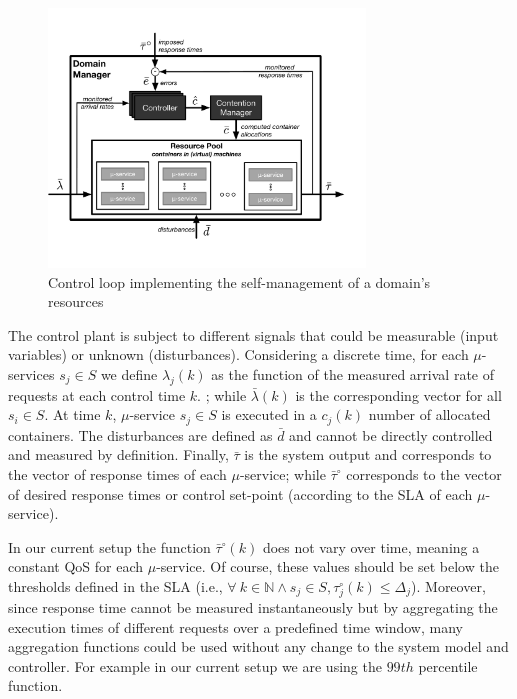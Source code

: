 \begin{figure}[tbp]
	\includegraphics[width=0.75\textwidth]{figs/domain-manager-allocation}
	\caption{Control loop implementing the self-management of a domain's resources}
	\label{fig:A3Edomain-manager}
\end{figure}



The control plant is subject to different signals that could be measurable (input variables) or unknown (disturbances). Considering a discrete time, for each $\mu$-services $s_j \in S$ we define $\lambda_j(k)$ as the function of the measured arrival rate of requests at each control time $k$.
; while $\bar{\lambda}(k)$ is the corresponding vector for all $s_i \in S$. 
At time $k$, $\mu$-service $s_j \in S$ is executed in a $c_j(k)$ number of allocated containers. %
The disturbances are defined as $\bar{d}$ and cannot be directly controlled and measured by definition. Finally, $\bar{\tau}$ is the system output and corresponds to the vector of response times of each $\mu$-service; while $\bar{\tau}^\circ$ corresponds to the vector of desired response times or control set-point (according to the SLA of each $\mu$-service). 

In our current setup the function $\bar{\tau}^\circ(k)$ does not vary over time, meaning a constant QoS for each  $\mu$-service. Of course, these values should be set below the thresholds defined in the SLA (i.e., $\forall\ k \in \mathbb{N} \wedge  s_j \in S, {\tau}^\circ_j(k) \le \Delta_j$). Moreover, since response time cannot be measured instantaneously but by aggregating the execution times of different requests over a predefined time window, many aggregation functions could be used without any change to the system model and controller. For example in our current setup we are using the $99th$ percentile function. 

